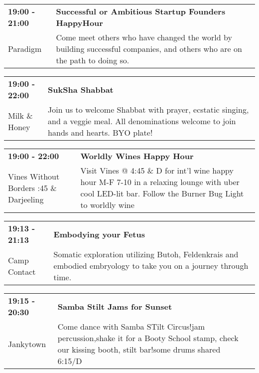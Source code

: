 \begin{tabular}{ p{1in} p{2.2in} }
    \textbf{19:00 - 21:00} & \textbf{Successful or Ambitious Startup Founders HappyHour} \\
    Paradigm \newline  & Come meet others who have changed the world by building successful companies, and others who are on the path to doing so. \\
    \hline 
\end{tabular}
    
\begin{tabular}{ p{1in} p{2.2in} }
    \textbf{19:00 - 22:00} & \textbf{SukSha Shabbat} \\
    Milk \& Honey \newline  & Join us to welcome Shabbat with prayer, ecstatic singing, and a veggie meal.  All denominations welcome to join hands and hearts. BYO plate! \\
    \hline 
\end{tabular}
    
\begin{tabular}{ p{1in} p{2.2in} }
    \textbf{19:00 - 22:00} & \textbf{Worldly Wines Happy Hour} \\
    Vines Without Borders \newline 4:45 \& Darjeeling & Visit Vines @ 4:45 \& D for int'l wine happy hour M-F 7-10 in a relaxing lounge with uber cool LED-lit bar. Follow the Burner Bug Light to worldly wine \\
    \hline 
\end{tabular}
    
\begin{tabular}{ p{1in} p{2.2in} }
    \textbf{19:13 - 21:13} & \textbf{Embodying your Fetus} \\
    Camp Contact \newline  & Somatic exploration utilizing Butoh, Feldenkrais and embodied embryology to take you on a journey through time. \\
    \hline 
\end{tabular}
    
\begin{tabular}{ p{1in} p{2.2in} }
    \textbf{19:15 - 20:30} & \textbf{Samba Stilt Jams for Sunset} \\
    Jankytown \newline  & Come dance with Samba STilt Circus!jam percussion,shake it for a Booty School stamp, check our kissing booth, stilt bar!some drums shared~ 6:15/D \\
    \hline 
\end{tabular}
    
